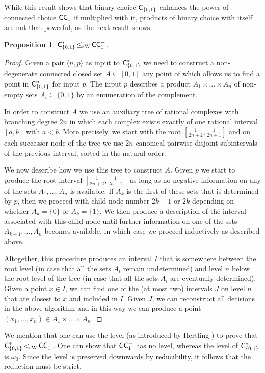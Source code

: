 \documentclass[a4paper]{amsart}
\def\In{\subseteq}
\def\C{\mbox{\rm\sffamily C}}
\def\ConC{\mbox{\rm\sffamily CC}}
\def\leqSW{\mathop{\leq_{\mathrm{sW}}}}
\def\lSW{\mathop{<_{\mathrm{sW}}}}
\newtheorem{proposition}[theorem]{Proposition}
\theoremstyle{definition}
\begin{document}
While this result shows that binary choice $\C_{\{0,1\}}$ enhances the power
of connected choice $\ConC_1$ if multiplied with it, products of binary choice
with itself are not that powerful, as the next result shows.

\begin{proposition}
\label{prop:binary-choice}
$\C_{\{0,1\}}^*\leqSW\ConC_1^-$.
\end{proposition}
\begin{proof}
Given a pair $\langle n,p\rangle$ as input to $\C_{\{0,1\}}^*$ we need
to construct a non-degenerate connected closed set $A\In[0,1]$ any point of which
allows us to find a point in $\C_{\{0,1\}}^n$ for input $p$. The input $p$ 
describes a product $A_1\times...\times A_n$ of non-empty sets $A_i\In\{0,1\}$
by an enumeration of the complement.

In order to construct $A$ we use an auxiliary tree of rational complexes with branching degree $2n$ 
in which each complex exists exactly of one rational interval $[a,b]$ with $a<b$. More precisely,
we start with the root $[\frac{1}{2n+2},\frac{1}{2n+1}]$ and on each successor node
of the tree we use $2n$ canonical pairwise disjoint subintervals of the previous interval,
sorted in the natural order.

We now describe how we use this tree to construct $A$. Given $p$ we start to produce the root interval
$[\frac{1}{2n+2},\frac{1}{2n+1}]$ as long as no negative information on any of the sets $A_1,...,A_n$
is available. If $A_k$ is the first of these sets that is determined by $p$,
then we proceed with child node number $2k-1$ or $2k$ depending on whether $A_k=\{0\}$ or $A_k=\{1\}$.
We then produce a description of the interval associated with this child node until further information on 
one of the sets $A_{k+1},...,A_n$ becomes available, in which case we proceed inductively as described above.

Altogether, this procedure produces an interval $I$ that is somewhere between the root level (in case that all the
sets $A_i$ remain undetermined) and level $n$ below the root level of the tree (in case that all the sets
$A_i$ are eventually determined). Given a point $x\in I$, we can find one of the (at most two) intervals $J$ on level $n$
that are closest to $x$ and included in $I$.  
Given $J$, we can reconstruct all decisions in the above algorithm 
and in this way we can produce a point $(x_1,...,x_n)\in A_1\times...\times A_n$.
\end{proof}

We mention that one can use the level (as introduced by Hertling \cite{Her96}) to prove that
$\C_{\{0,1\}}^*\lSW\ConC_1^-$. One can show that $\ConC_1^-$ has no level, whereas
the level of $\C_{\{0,1\}}^*$ is $\omega_0$. Since the level is preserved downwards by reducibility,
it follows that the reduction must be strict.
\end{document}
